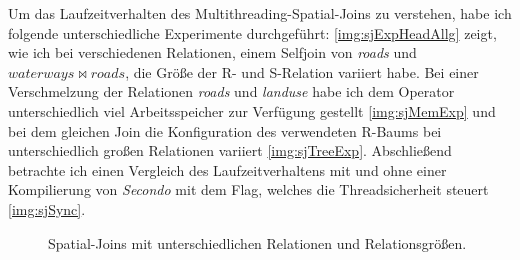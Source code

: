 \documentclass[a4paper,12pt,twoside]{article}
\newcommand{\Fb}[1]{\textit{#1}} %
\begin{document}
Um das Laufzeitverhalten des Multithreading-Spatial-Joins zu verstehen, habe ich folgende unterschiedliche Experimente durchgeführt: \autoref{img:sjExpHeadAllg} zeigt, wie ich bei verschiedenen Relationen, einem Selfjoin von \Fb{roads} und $waterways \bowtie roads$, die Größe der R- und S-Relation variiert habe. Bei einer Verschmelzung der Relationen \Fb{roads} und \Fb{landuse} habe ich dem Operator unterschiedlich viel Arbeitsspeicher zur Verfügung gestellt \autoref{img:sjMemExp} und bei dem gleichen Join die Konfiguration des verwendeten R-Baums bei unterschiedlich großen Relationen variiert \autoref{img:sjTreeExp}. Abschließend betrachte ich einen Vergleich des Laufzeitverhaltens mit und ohne einer Kompilierung von \Fb{Secondo} mit dem Flag, welches die Threadsicherheit steuert {\autoref{img:sjSync}}. 

\begin{figure}[H]
	\centering
	\qquad	
	\caption{Spatial-Joins mit unterschiedlichen Relationen und Relationsgrößen.}
	\label{img:sjExpHeadAllg}
\end{figure}
\end{document}
